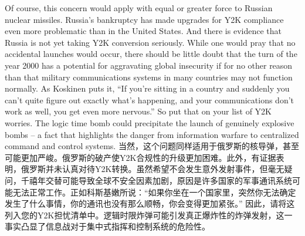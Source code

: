 \begin{Parallel}{97mm}{45mm}
  \ParallelLText
  {Of course, this concern would apply with equal or greater force to Russian nuclear missiles. Russia's bankruptcy has made upgrades for Y2K compliance even more problematic than in the United States. And there is evidence that Russia is not yet taking Y2K conversion seriously. While one would pray that no accidental launches would occur, there should be little doubt that the turn of the year 2000 has a potential for aggravating global insecurity if for no other reason than that military communications systems in many countries may not function normally. As Koskinen puts it, “If you're sitting in a country and suddenly you can't quite figure out exactly what's happening, and your communications don't work as well, you get even more nervous.” So put that on your list of Y2K worries. The logic time bomb could precipitate the launch of genuinely explosive bombs -- a fact that highlights the danger from information warfare to centralized command and control systems.}  
  \ParallelRText
  {\small 当然，这个问题同样适用于俄罗斯的核导弹，甚至可能更加严峻。俄罗斯的破产使Y2K合规性的升级更加困难。此外，有证据表明，俄罗斯并未认真对待Y2K转换。虽然希望不会发生意外发射事件，但毫无疑问，千禧年交替可能导致全球不安全因素加剧，原因是许多国家的军事通讯系统可能无法正常工作。正如科斯基嫩所说：“如果你坐在一个国家里，突然你无法确定发生了什么事情，你的通讯也没有那么顺畅，你会变得更加紧张。” 因此，请将这列入您的Y2K担忧清单中。逻辑时限炸弹可能引发真正爆炸性的炸弹发射，这一事实凸显了信息战对于集中式指挥和控制系统的危险性。}
  \ParallelPar



\end{Parallel}
